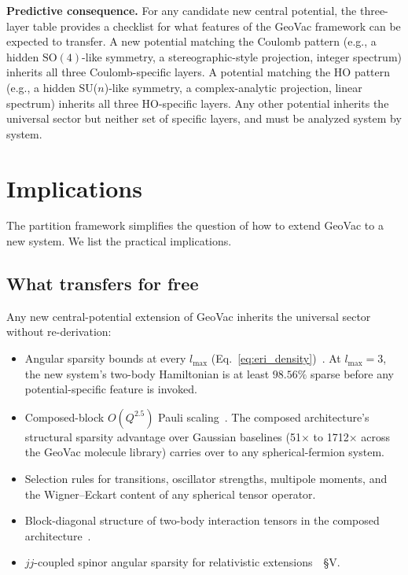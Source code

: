 \documentclass[twocolumn,pra,amsmath,amssymb,superscriptaddress]{revtex4-2}
\begin{document}
\medskip\noindent\textbf{Predictive consequence.}  For any candidate
new central potential, the three-layer table provides a checklist
for what features of the GeoVac framework can be expected to
transfer.  A new potential matching the Coulomb pattern (e.g., a
hidden $\mathrm{SO}(4)$-like symmetry, a stereographic-style
projection, integer spectrum) inherits all three Coulomb-specific
layers.  A potential matching the HO pattern (e.g., a hidden
SU($n$)-like symmetry, a complex-analytic projection, linear
spectrum) inherits all three HO-specific layers.  Any other potential
inherits the universal sector but neither set of specific layers,
and must be analyzed system by system.

\section{Implications}
\label{sec:implications}

The partition framework simplifies the question of how to extend
GeoVac to a new system.  We list the practical implications.

\subsection{What transfers for free}

Any new central-potential extension of GeoVac inherits the universal
sector without re-derivation:

\begin{itemize}
\item Angular sparsity bounds at every $l_{\max}$
  (Eq.~\eqref{eq:eri_density})~\cite{paper22}.  At $l_{\max} = 3$,
  the new system's two-body Hamiltonian is at least $98.56\%$
  sparse before any potential-specific feature is invoked.
\item Composed-block $O(Q^{2.5})$ Pauli scaling~\cite{paper14}.  The
  composed architecture's structural sparsity advantage over
  Gaussian baselines (51$\times$ to 1712$\times$ across the GeoVac
  molecule library) carries over to any spherical-fermion system.
\item Selection rules for transitions, oscillator strengths,
  multipole moments, and the Wigner--Eckart content of any
  spherical tensor operator.
\item Block-diagonal structure of two-body interaction tensors in
  the composed architecture~\cite{paper17}.
\item $jj$-coupled spinor angular sparsity for relativistic
  extensions~\cite{paper14}~\S V.
\end{itemize}
\end{document}
